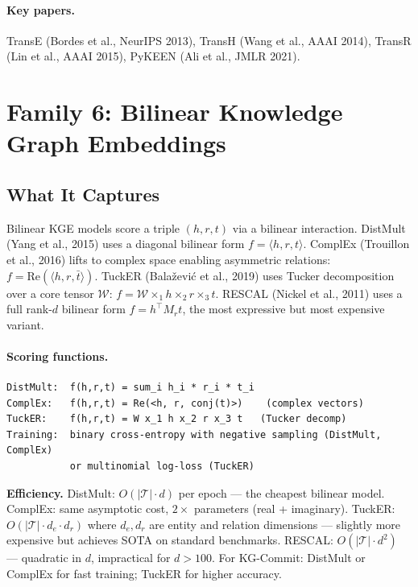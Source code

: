 \documentclass[12pt,a4paper]{article}
\begin{document}
\paragraph{Key papers.} TransE (Bordes et al., NeurIPS 2013), TransH (Wang et al.,
AAAI 2014), TransR (Lin et al., AAAI 2015), PyKEEN (Ali et al., JMLR 2021).

\section{Family 6: Bilinear Knowledge Graph Embeddings}

\subsection{What It Captures}

Bilinear KGE models score a triple $(h, r, t)$ via a bilinear interaction.
DistMult (Yang et al., 2015) uses a diagonal bilinear form $f = \langle h, r,
t \rangle$. ComplEx (Trouillon et al., 2016) lifts to complex space enabling
asymmetric relations: $f = \text{Re}(\langle h, r, \bar{t} \rangle)$.
TuckER (Bala\v{z}evi\'{c} et al., 2019) uses Tucker decomposition over a core
tensor $\mathcal{W}$: $f = \mathcal{W} \times_1 h \times_2 r \times_3 t$.
RESCAL (Nickel et al., 2011) uses a full rank-$d$ bilinear form $f = h^\top
M_r t$, the most expressive but most expensive variant.

\paragraph{Scoring functions.}
\begin{lstlisting}
DistMult:  f(h,r,t) = sum_i h_i * r_i * t_i
ComplEx:   f(h,r,t) = Re(<h, r, conj(t)>)    (complex vectors)
TuckER:    f(h,r,t) = W x_1 h x_2 r x_3 t   (Tucker decomp)
Training:  binary cross-entropy with negative sampling (DistMult, ComplEx)
           or multinomial log-loss (TuckER)
\end{lstlisting}

\begin{effbox}
\textbf{Efficiency.}
DistMult: $O(|\mathcal{T}| \cdot d)$ per epoch --- the cheapest bilinear
model. ComplEx: same asymptotic cost, $2\times$ parameters (real + imaginary).
TuckER: $O(|\mathcal{T}| \cdot d_e \cdot d_r)$ where $d_e, d_r$ are entity
and relation dimensions --- slightly more expensive but achieves SOTA on
standard benchmarks. RESCAL: $O(|\mathcal{T}| \cdot d^2)$ --- quadratic in
$d$, impractical for $d > 100$. For KG-Commit: DistMult or ComplEx for fast
training; TuckER for higher accuracy.
\end{effbox}
\end{document}
